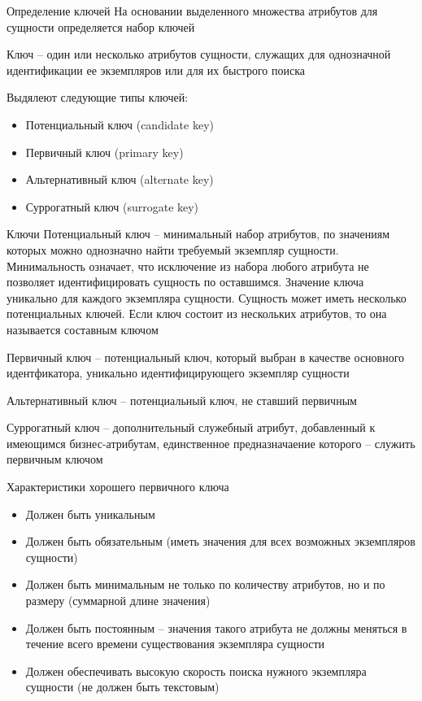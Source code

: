 \documentclass[12pt]{article}
\begin{document}
\begin{defin}{Определение ключей}
    На основании выделенного множества атрибутов для сущности определяется набор ключей 

    Ключ -- один или несколько атрибутов сущности, служащих для однозначной идентификации ее экземпляров или для их быстрого поиска 

    Выдялеют следующие типы ключей:

    \begin{itemize}
        \item Потенциальный ключ (candidate key)
        \item Первичный ключ (primary key)
        \item Альтернативный ключ (alternate key)
        \item Суррогатный ключ (surrogate key)
    \end{itemize}
\end{defin}

\begin{defin}{Ключи}
    Потенциальный ключ -- минимальный набор атрибутов, по значениям которых можно однозначно найти требуемый экземпляр сущности. Минимальность означает, что исключение из набора любого атрибута не позволяет идентифицировать сущность по оставшимся. Значение ключа уникально для каждого экземпляра сущности. Сущность может иметь несколько потенциальных ключей. Если ключ состоит из нескольких атрибутов, то она называется составным ключом 

    Первичный ключ -- потенциальный ключ, который выбран в качестве основного идентфикатора, уникально идентифицирующего экземпляр сущности 

    Альтернативный ключ -- потенциальный ключ, не ставший первичным 

    Суррогатный ключ -- дополнительный служебный атрибут, добавленный к имеющимся бизнес-атрибутам, единственное предназначаение которого -- служить первичным ключом 
\end{defin}

\begin{nota}{Характеристики хорошего первичного ключа}
    \begin{itemize}
        \item Должен быть уникальным 
        \item Должен быть обязательным (иметь значения для всех возможных экземпляров сущности)
        \item Должен быть минимальным не только по количеству атрибутов, но и по размеру (суммарной длине значения)
        \item Должен быть постоянным -- значения такого атрибута не должны меняться в течение всего времени существования экземпляра сущности 
        \item Должен обеспечивать высокую скорость поиска нужного экземпляра сущности (не должен быть текстовым)
    \end{itemize}
\end{nota}
\end{document}
